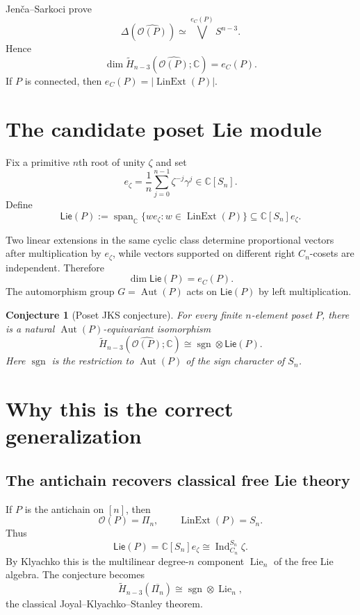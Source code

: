 \documentclass[11pt]{article}
\newtheorem{conjecture}{Conjecture}
\newcommand{\OP}{\mathcal O}
\newcommand{\Lin}{\operatorname{LinExt}}
\newcommand{\Aut}{\operatorname{Aut}}
\newcommand{\Lie}{\operatorname{Lie}}
\newcommand{\sgn}{\operatorname{sgn}}
\newcommand{\Ind}{\operatorname{Ind}}
\begin{document}
Jen\v{c}a--Sarkoci prove
\[
\Delta(\widehat{\OP(P)})\simeq\bigvee^{e_C(P)}S^{n-3}.
\]
Hence
\begin{equation}
\dim \widetilde H_{n-3}(\widehat{\OP(P)};\mathbb C)=e_C(P).
\label{eq:JSdim}
\end{equation}
If $P$ is connected, then $e_C(P)=|\Lin(P)|$.

\section{The candidate poset Lie module}
Fix a primitive $n$th root of unity $\zeta$ and set
\[
e_\zeta=\frac1n\sum_{j=0}^{n-1}\zeta^{-j}\gamma^j\in\mathbb C[S_n].
\]
Define
\begin{equation}
\mathsf{Lie}(P):=\operatorname{span}_{\mathbb C}\{we_\zeta:w\in\Lin(P)\}
\subseteq\mathbb C[S_n]e_\zeta.
\label{eq:posetLie}
\end{equation}

Two linear extensions in the same cyclic class determine proportional
vectors after multiplication by $e_\zeta$, while vectors supported on
different right $C_n$-cosets are independent. Therefore
\begin{equation}
\dim \mathsf{Lie}(P)=e_C(P).
\label{eq:posetLiedim}
\end{equation}
The automorphism group $G=\Aut(P)$ acts on $\mathsf{Lie}(P)$ by left
multiplication.

\begin{conjecture}[Poset JKS conjecture]
For every finite $n$-element poset $P$, there is a natural
$\Aut(P)$-equivariant isomorphism
\begin{equation}
\boxed{
\widetilde H_{n-3}(\widehat{\OP(P)};\mathbb C)
\cong \sgn\otimes\mathsf{Lie}(P).}
\label{eq:mainconj}
\end{equation}
Here $\sgn$ is the restriction to $\Aut(P)$ of the sign character of $S_n$.
\end{conjecture}

\section{Why this is the correct generalization}

\subsection{The antichain recovers classical free Lie theory}
If $P$ is the antichain on $[n]$, then
\[
\OP(P)=\Pi_n,\qquad \Lin(P)=S_n.
\]
Thus
\[
\mathsf{Lie}(P)=\mathbb C[S_n]e_\zeta\cong\Ind_{C_n}^{S_n}\zeta.
\]
By Klyachko this is the multilinear degree-$n$ component $\Lie_n$ of the
free Lie algebra. The conjecture becomes
\[
\widetilde H_{n-3}(\overline{\Pi_n})\cong\sgn\otimes\Lie_n,
\]
the classical Joyal--Klyachko--Stanley theorem.
\end{document}
